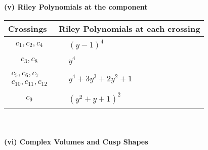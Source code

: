 \documentclass[1p]{elsarticle_modified}
\theoremstyle{definition}
\begin{document}
\newpage\renewcommand{\arraystretch}{1}
\flushleft \textbf{(v) Riley Polynomials at the component}\newline \\
\begin{tabular}{m{50pt}|m{274pt}}
Crossings & \hspace{64pt}Riley Polynomials at each crossing \\
\hline $$\begin{aligned}c_{1},c_{2},c_{4}\end{aligned}$$&$\begin{aligned}
&(y-1)^4
\end{aligned}$\\
\hline $$\begin{aligned}c_{3},c_{8}\end{aligned}$$&$\begin{aligned}
&y^4
\end{aligned}$\\
\hline $$\begin{aligned}c_{5},c_{6},c_{7}\\c_{10},c_{11},c_{12}\end{aligned}$$&$\begin{aligned}
&y^4+3 y^3+2 y^2+1
\end{aligned}$\\
\hline $$\begin{aligned}c_{9}\end{aligned}$$&$\begin{aligned}
&(y^2+y+1)^2
\end{aligned}$\\
\hline
\end{tabular}\\~\\
\newpage\flushleft \textbf{(vi) Complex Volumes and Cusp Shapes}
\end{document}
